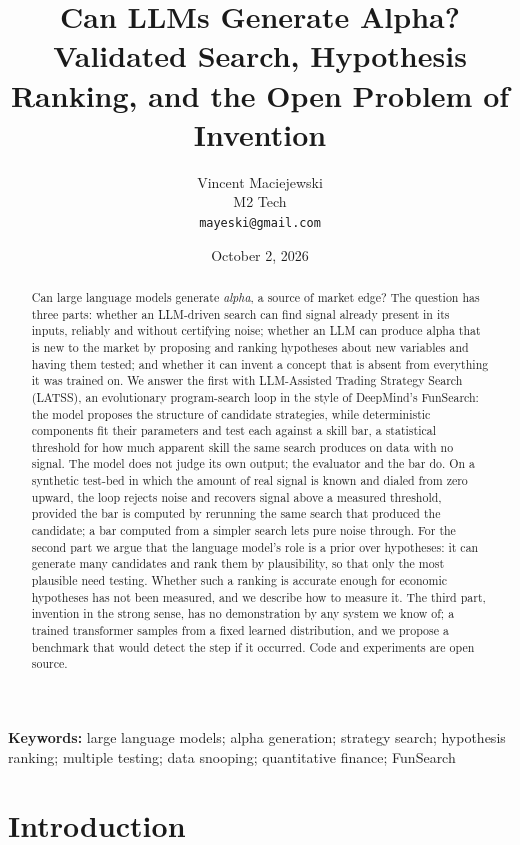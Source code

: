 \documentclass[11pt]{article}
\title{\textbf{Can LLMs Generate Alpha?\\
Validated Search, Hypothesis Ranking, and the Open Problem of Invention}}
\author{Vincent Maciejewski\\
\small M2 Tech\\
\small \texttt{mayeski@gmail.com}}
\date{October 2, 2026}
\begin{document}
\maketitle

\begin{abstract}
Can large language models generate \emph{alpha}, a source of market edge? The question has three parts:
whether an LLM-driven search can find signal already present in its inputs, reliably and without
certifying noise; whether an LLM can produce alpha that is new to the market by proposing and ranking
hypotheses about new variables and having them tested; and whether it can invent a concept that is
absent from everything it was trained on. We answer the first with LLM-Assisted Trading Strategy Search
(LATSS), an evolutionary program-search loop in the style of DeepMind's FunSearch: the model proposes the
structure of candidate strategies, while deterministic components fit their parameters and test each
against a skill bar, a statistical threshold for how much apparent skill the same search produces on data
with no signal. The model does not judge its own output; the evaluator and the bar do. On a synthetic
test-bed in which the amount of real signal is known and dialed from zero upward, the loop rejects noise
and recovers signal above a measured threshold, provided the bar is computed by rerunning the same search
that produced the candidate; a bar computed from a simpler search lets pure noise through. 
For the second part we argue that the language model's role is a prior over hypotheses: it can
generate many candidates and rank them by plausibility, so that only the most plausible need testing.
Whether such a ranking is accurate enough for economic hypotheses has not been measured, and we describe
how to measure it. The third part, invention in the strong sense, has no demonstration by any system we
know of; a trained transformer samples from a fixed learned distribution, and we propose a benchmark that
would detect the step if it occurred. Code and experiments are open source.
\end{abstract}

\noindent\textbf{Keywords:} large language models; alpha generation; strategy search; hypothesis ranking; multiple testing; data snooping; quantitative finance; FunSearch

\clearpage
\tableofcontents

\section{Introduction}
\end{document}
